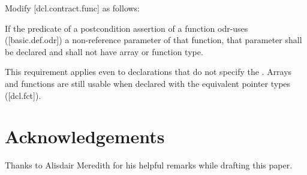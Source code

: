 Modify [dcl.contract.func] as follows:

\begin{adjustwidth}{0.5cm}{0.5cm}
If the predicate of a postcondition assertion of a function odr-uses ([basic.def.odr]) a
non-reference parameter of that function, that parameter shall be declared  and shall not have array or function type.
\begin{note}
This requirement applies even to declarations
that do not specify the . Arrays and functions are still usable when declared with the equivalent pointer types ([dcl.fct]).
\end{note}
\begin{example}
\tcode{[...]}
\end{example}

\end{adjustwidth}


\section*{Acknowledgements}
Thanks to Alisdair Meredith for his helpful remarks while drafting this paper.


\renewcommand{\addcontentsline}[3]{}%







